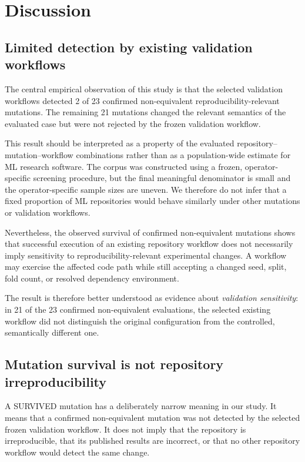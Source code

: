 \section{Discussion}
\label{sec:discussion}

\subsection{Limited detection by existing validation workflows}
\label{sec:discussion-detection}

The central empirical observation of this study is that the selected validation
workflows detected 2 of 23 confirmed non-equivalent
reproducibility-relevant mutations. The remaining 21 mutations changed the
relevant semantics of the evaluated case but were not rejected by the frozen
validation workflow.

This result should be interpreted as a property of the evaluated
repository--mutation--workflow combinations rather than as a population-wide
estimate for ML research software. The corpus was constructed using a frozen,
operator-specific screening procedure, but the final meaningful denominator is
small and the operator-specific sample sizes are uneven. We therefore do not
infer that a fixed proportion of ML repositories would behave similarly under
other mutations or validation workflows.

Nevertheless, the observed survival of confirmed non-equivalent mutations
shows that successful execution of an existing repository workflow does not
necessarily imply sensitivity to reproducibility-relevant experimental
changes. A workflow may exercise the affected code path while still accepting
a changed seed, split, fold count, or resolved dependency environment.

The result is therefore better understood as evidence about \emph{validation
sensitivity}: in 21 of the 23 confirmed non-equivalent evaluations, the
selected existing workflow did not distinguish the original configuration from
the controlled, semantically different one.


\subsection{Mutation survival is not repository irreproducibility}
\label{sec:discussion-survival}

A SURVIVED mutation has a deliberately narrow meaning in our study. It means
that a confirmed non-equivalent mutation was not detected by the selected
frozen validation workflow. It does not imply that the repository is
irreproducible, that its published results are incorrect, or that no other
repository workflow would detect the same change.

